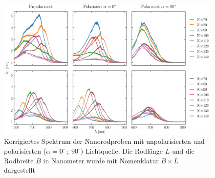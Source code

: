 \newpage
\begin{figure}
    \centering
    \includegraphics[width = \textheight]{Bilder/Auswertung/3.2/Spektren_Gruppe2.pdf}
    \caption{Korrigiertes Spektrum der Nanorodproben mit unpolarisierten und polarisierten ($\alpha = 0^\circ~;~90^\circ$) Lichtquelle. Die Rodlänge $L$ und die Rodbreite $B$ in Nanometer wurde mit Nomenklatur $B \times L$ dargestellt}
    \label{fig:spektrum}
\end{figure}